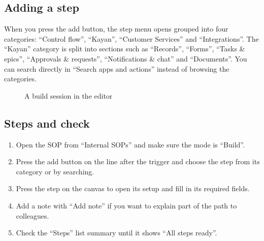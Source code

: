 \subsection{Adding a step}

When you press the add button, the step menu opens grouped into four categories: “Control flow”, “Kayan”, “Customer Services” and “Integrations”. The “Kayan” category is split into sections such as “Records”, “Forms”, “Tasks \& epics”, “Approvals \& requests”, “Notifications \& chat” and “Documents”. You can search directly in “Search apps and actions” instead of browsing the categories.

\begin{figure}[H]
\centering
{}
\rclegend
\caption{A build session in the editor}
\label{fig:builder-isop-editor-flow}
\end{figure}

\subsection{Steps and check}
\begin{enumerate}
\item Open the SOP from “Internal SOPs” and make sure the mode is “Build”.
\item Press the add button on the line after the trigger and choose the step from its category or by searching.
\item Press the step on the canvas to open its setup and fill in its required fields.
\item Add a note with “Add note” if you want to explain part of the path to colleagues.
\item Check the “Steps” list summary until it shows “All steps ready”.
\end{enumerate}

